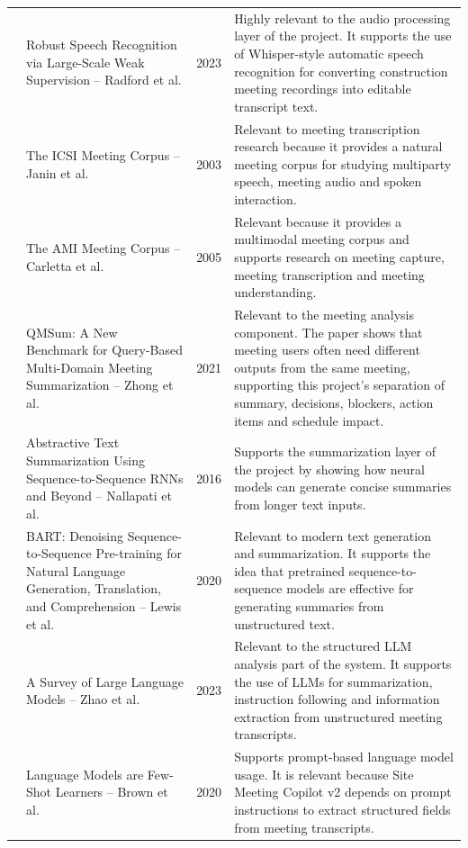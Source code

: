 \documentclass[11pt,a4paper]{article}
\begin{document}
\begin{longtable}{p{0.9cm}p{5.0cm}p{1.1cm}p{5.4cm}}
\cite{whisper} & Robust Speech Recognition via Large-Scale Weak Supervision -- Radford et al. & 2023 & Highly relevant to the audio processing layer of the project. It supports the use of Whisper-style automatic speech recognition for converting construction meeting recordings into editable transcript text. \\

\cite{icsi} & The ICSI Meeting Corpus -- Janin et al. & 2003 & Relevant to meeting transcription research because it provides a natural meeting corpus for studying multiparty speech, meeting audio and spoken interaction. \\

\cite{ami} & The AMI Meeting Corpus -- Carletta et al. & 2005 & Relevant because it provides a multimodal meeting corpus and supports research on meeting capture, meeting transcription and meeting understanding. \\

\cite{qmsum} & QMSum: A New Benchmark for Query-Based Multi-Domain Meeting Summarization -- Zhong et al. & 2021 & Relevant to the meeting analysis component. The paper shows that meeting users often need different outputs from the same meeting, supporting this project's separation of summary, decisions, blockers, action items and schedule impact. \\

\cite{nallapati2016} & Abstractive Text Summarization Using Sequence-to-Sequence RNNs and Beyond -- Nallapati et al. & 2016 & Supports the summarization layer of the project by showing how neural models can generate concise summaries from longer text inputs. \\

\cite{bart2020} & BART: Denoising Sequence-to-Sequence Pre-training for Natural Language Generation, Translation, and Comprehension -- Lewis et al. & 2020 & Relevant to modern text generation and summarization. It supports the idea that pretrained sequence-to-sequence models are effective for generating summaries from unstructured text. \\

\cite{llmsurvey} & A Survey of Large Language Models -- Zhao et al. & 2023 & Relevant to the structured LLM analysis part of the system. It supports the use of LLMs for summarization, instruction following and information extraction from unstructured meeting transcripts. \\

\cite{brown2020} & Language Models are Few-Shot Learners -- Brown et al. & 2020 & Supports prompt-based language model usage. It is relevant because Site Meeting Copilot v2 depends on prompt instructions to extract structured fields from meeting transcripts. \\


\end{longtable}
\end{document}
